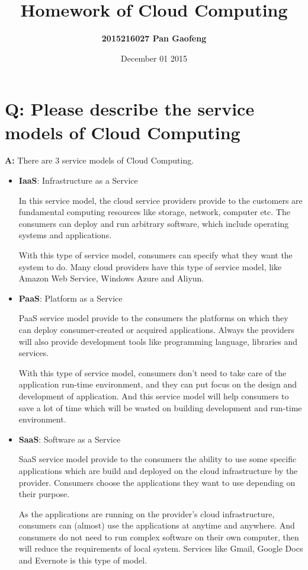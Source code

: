 \documentclass[a4paper]{article}
\title{Homework of Cloud Computing}
\author{\Large \textbf{2015216027 \hspace{2cm} Pan Gaofeng}}
\date{December 01 2015}
\begin{document}
\Large
\maketitle

\section{ Q: Please describe the service models of Cloud Computing}

\hspace{1cm}\textbf{A:} There are 3 service models of Cloud Computing.

\begin{itemize}
\item \textbf{IaaS}: Infrastructure as a Service

In this service model, the cloud service providers provide to the customers are fundamental computing resources like storage, network, computer etc. The consumers can deploy and run arbitrary software, which include operating systems and applications. 

With this type of service model, consumers can specify what they want the system to do. Many cloud providers have this type of service model, like Amazon Web Service, Windows Azure and Aliyun.

\vspace{2mm} 

\item \textbf{PaaS}: Platform as a Service

PaaS service model provide to the consumers the platforms on which they can deploy consumer-created or acquired applications. Always the providers will also provide development tools like programming language, libraries and services.

With this type of service model, consumers don't need to take care of the application run-time environment, and they can put focus on the design and development of application. And this service model will help consumers to save a lot of time which will be wasted on building development and run-time environment.

\vspace{2mm} 

\item \textbf{SaaS}: Software as a Service

SaaS service model provide to the consumers the ability to use some specific applications which are build and deployed on the cloud infrastructure by the provider. Consumers choose the applications they want to use depending on their purpose.

As the applications are running on the provider's cloud infrastructure, consumers can (almost) use the applications at anytime and anywhere. And consumers do not need to run complex software on their own computer, then will reduce the requirements of local system. Services like Gmail, Google Docs and Evernote is this type of model.

\vspace{2mm} 

\end{itemize}
\end{document}
